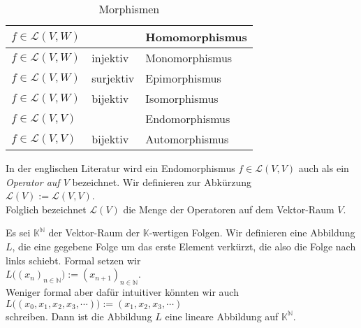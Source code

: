 \begin{table}[h]
  \centering
  \begin{tabular}{||l|l|l||}
    \hline
    \hline
   $f \in \mathcal{L}(V,W)$ &           & Homomorphismus \\ 
    \hline
   $f \in \mathcal{L}(V,W)$ & injektiv  & Monomorphismus \\ 
    \hline
   $f \in \mathcal{L}(V,W)$ & surjektiv & Epimorphismus \\ 
    \hline
   $f \in \mathcal{L}(V,W)$ & bijektiv  & Isomorphismus \\ 
    \hline
   $f \in \mathcal{L}(V,V)$ &           & Endomorphismus \\ 
    \hline
   $f \in \mathcal{L}(V,V)$ & bijektiv  & Automorphismus \\ 
    \hline
    \hline
  \end{tabular}
  \caption{Morphismen}
  \label{tab:morphism}
\end{table}

In der englischen Literatur wird ein  Endomorphismus $f \in \mathcal{L}(V,V)$ auch als ein
\emph{Operator auf $V$} bezeichnet.  Wir definieren zur Abk\"{u}rzung
\\[0.2cm]
\hspace*{1.3cm}
$\mathcal{L}(V) := \mathcal{L}(V,V)$.
\\[0.2cm]
Folglich bezeichnet $\mathcal{L}(V)$ die Menge der Operatoren auf dem Vektor-Raum $V$.
\eoxs

\example
Es sei $\mathbb{K}^\mathbb{N}$ der Vektor-Raum der $\mathbb{K}$-wertigen Folgen.  Wir definieren
eine Abbildung $L$, die eine gegebene Folge um das erste Element verk\"{u}rzt, die also die Folge nach
links schiebt.  Formal setzen wir
\\[0.2cm]
\hspace*{1.3cm}
$L\bigl( (x_n)_{n\in \mathbb{N}} \bigr) := (x_{n+1})_{n\in\mathbb{N}}$.
\\[0.2cm]
Weniger formal aber daf\"{u}r intuitiver k\"{o}nnten wir auch
\\[0.2cm]
\hspace*{1.3cm}
$L\bigl( (x_0, x_1, x_2, x_3, \cdots) \bigr) := (x_1, x_2, x_3, \cdots)$
\\[0.2cm]
schreiben.  Dann ist die Abbildung $L$ eine lineare Abbildung auf $\mathbb{K}^\mathbb{N}$.
\eoxs

